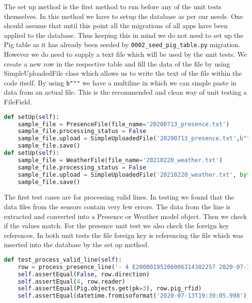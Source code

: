 The set up method is the first method to run before any of the unit tests themselves. In this method we have to setup the database
as per our needs. One should assume that until this point all the migrations of all apps have been applied to the database. Thus keeping 
this in mind we do not need to set up the Pig table as it has already been seeded by \texttt{0002\_seed\_pig\_table.py} migration. However
we do need to supply a text file which will be used by the unit tests. We create a new row in the respective table and fill the data of the
file by using SimpleUploadedFile class which allows us to write the text of the file within the code itself. By using \texttt{b"""} we
have a multiline in which we can simple paste in data from an actual file. This is the recommended and clean way of unit testing a FileField.
\cite{stackoverflow_unittest_filefield}

\begin{lstlisting}[language={Python}]
def setUp(self):
	sample_file = PresenceFile(file_name='20200713_presence.txt')
	sample_file.processing_status = False
	sample_file.upload = SimpleUploadedFile('20200713_presence.txt',b"""+ 1 E2000019991100851580391E 2020-07-13T17:17:35.321 - 4 E20000195206006314302257 2020-07-13T19:39:05.998""")
	sample_file.save()
def setUp(self):
	sample_file = WeatherFile(file_name='20210220_weather.txt')
	sample_file.processing_status = False
	sample_file.upload = SimpleUploadedFile('20210220_weather.txt',	bytes("""temperature: -1.34C, pressure: 1114.18hPa, humidity:  92.09%, time: 2021-02-20T00:00:31.451 temperature: -1.02C, pressure: 1114.19hPa, humidity:  93.36%, time: 2021-02-20T00:20:32.050""" , 'utf-8'))
	sample_file.save()
\end{lstlisting}

The first test cases are for processing valid lines. In testing we found that the data files from the sensors contain
very few errors. The data from the line is extracted and converted into a Presence or Weather model object. Then we check if the values
match. For the presence unit test we also check the foreign key references. In both unit tests the file foreign key is referencing the
file which was inserted into the database by the set up method.

\begin{lstlisting}[language={Python}]
def test_process_valid_line(self):
	row = process_presence_line('- 4 E20000195206006314302257 2020-07-13T19:39:05.998',	PresenceFile.objects.first())
	self.assertEqual(False, row.direction)
	self.assertEqual(4, row.reader)
	self.assertEqual(Pig.objects.get(pk=3), row.pig_rfid)
	self.assertEqual(datetime.fromisoformat('2020-07-13T19:39:05.998'), row.timestamp)
\end{lstlisting}

